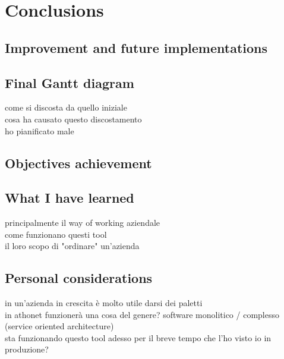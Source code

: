 \chapter{Conclusions}
\label{conclusions}

\section{Improvement and future implementations}

\section{Final Gantt diagram}
	come si discosta da quello iniziale\\
	cosa ha causato questo discostamento\\
	ho pianificato male
	
\section{Objectives achievement}

\section{What I have learned}
	principalmente il way of working aziendale\\
	come funzionano questi tool\\
	il loro scopo di "ordinare" un'azienda

\section{Personal considerations}
	in un'azienda in crescita è molto utile darsi dei paletti\\
	in athonet funzionerà una cosa del genere?  software monolitico / complesso (service oriented architecture)\\
	sta funzionando questo tool adesso per il breve tempo che l'ho visto io in produzione?
